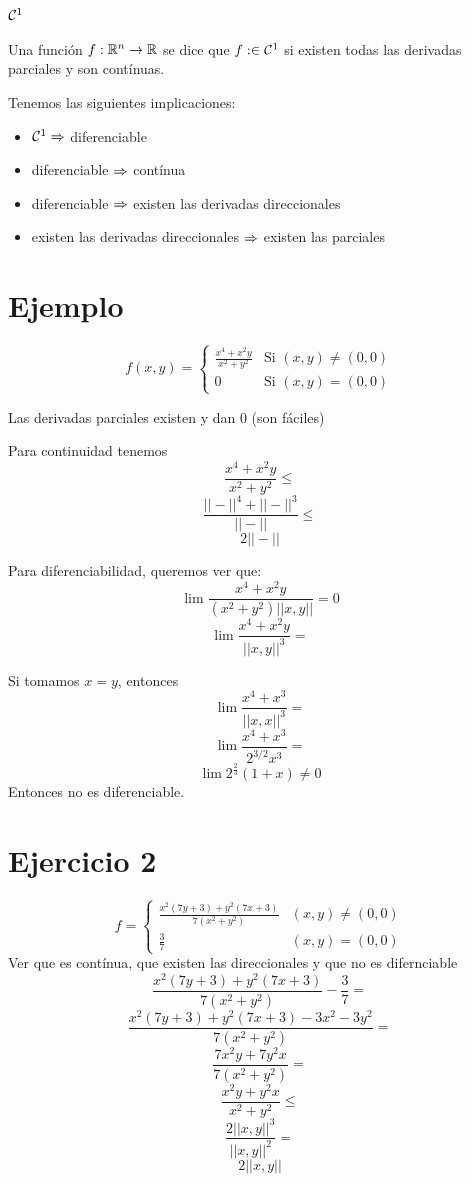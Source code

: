 \documentclass{article}
\begin{document}
\section*{$\mathcal{C}^1$}
	Una función $f : \mathbb{R}^n \to \mathbb{R}$ se dice que $f : \in \mathcal{C}^1$ si existen todas las derivadas parciales y son contínuas.

	Tenemos las siguientes implicaciones:
	\begin{itemize}
		\item $\mathcal{C}^1 \Rightarrow $ diferenciable
		\item diferenciable $\Rightarrow$ contínua
		\item diferenciable $\Rightarrow$ existen las derivadas direccionales
		\item existen las derivadas direccionales $\Rightarrow$ existen las parciales
	\end{itemize}

\section*{Ejemplo}
\[f(x, y) = 
\begin{cases}
	\frac{x^4+x^2y}{x^2 + y^2} & \text{Si $(x,y) \neq (0,0)$}\\
	0 & \text{Si $(x,y) = (0,0)$}
\end{cases}\]

Las derivadas parciales existen y dan $0$ (son fáciles)

Para continuidad tenemos
\[\frac{x^4+x^2y}{x^2+y^2} \leq\]
\[\frac{||-||^4+||-||^3}{||-||} \leq\]
\[2||-||\]

Para diferenciabilidad, queremos ver que:
\[\lim\frac{x^4+x^2y}{(x^2+y^2)||x,y||} = 0\]
\[\lim\frac{x^4+x^2y}{||x,y||^3} =\]

Si tomamos $x = y$, entonces
\[\lim\frac{x^4+x^3}{||x,x||^3} =\]
\[\lim\frac{x^4+x^3}{2^{3/2}x^3} =\]
\[\lim 2^\frac{2}{3}(1+x) \neq 0\]
Entonces no es diferenciable.

\section*{Ejercicio 2}
\[
	f = 
	\begin{cases}
		\frac{x^2(7y+3)+y^2(7x+3)}{7(x^2+y^2)} & (x,y) \neq (0,0)\\
		\frac{3}{7} & (x,y) = (0,0)
	\end{cases}
\]
Ver que es contínua, que existen las direccionales y que no es difernciable
\[\frac{x^2(7y+3)+y^2(7x+3)}{7(x^2+y^2)} - \frac{3}{7}=\]
\[\frac{x^2(7y+3)+y^2(7x+3) - 3x^2 - 3y^2}{7(x^2+y^2)}=\]
\[\frac{7x^2y+7y^2x}{7(x^2+y^2)}=\]
\[\frac{x^2y+y^2x}{x^2+y^2}\leq\]
\[\frac{2||x,y||^3}{||x,y||^2}=\]
\[2||x,y||\]
\end{document}
